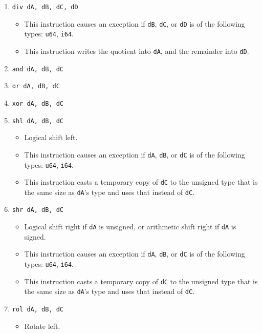 \documentclass{article}
\begin{document}
\begin{itemize}
\begin{enumerate}
			\item \texttt{div dA, dB, dC, dD}
				\begin{itemize}
				\item This instruction causes an exception if \texttt{dB},
				\texttt{dC}, or \texttt{dD} is of the following types:
				\texttt{u64}, \texttt{i64}.

				\item This instruction writes the quotient into
				\texttt{dA}, and the remainder into \texttt{dD}.
				\end{itemize}
			\item \texttt{and dA, dB, dC}
			\item \texttt{or dA, dB, dC}
			\item \texttt{xor dA, dB, dC}

			\item \texttt{shl dA, dB, dC}
				\begin{itemize}
				\item Logical shift left.

				\item This instruction causes an exception if \texttt{dA},
				\texttt{dB}, or \texttt{dC} is of the following types:
				\texttt{u64}, \texttt{i64}.

				\item This instruction casts a temporary copy of
				\texttt{dC} to the unsigned type that is the same size as
				\texttt{dA}'s type and uses that instead of \texttt{dC}.
				\end{itemize}
			\item \texttt{shr dA, dB, dC}
				\begin{itemize}
				\item Logical shift right if \texttt{dA} is unsigned, or
				arithmetic shift right if \texttt{dA} is signed.

				\item This instruction causes an exception if \texttt{dA},
				\texttt{dB}, or \texttt{dC} is of the following types:
				\texttt{u64}, \texttt{i64}.

				\item This instruction casts a temporary copy of
				\texttt{dC} to the unsigned type that is the same size as
				\texttt{dA}'s type and uses that instead of \texttt{dC}.
				\end{itemize}
			\item \texttt{rol dA, dB, dC}
				\begin{itemize}
				\item Rotate left.


\end{itemize}
\end{enumerate}
\end{itemize}
\end{document}
